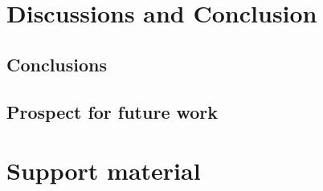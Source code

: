 \documentclass[
oneside,
11pt, a4paper,
footinclude=true,
headinclude=true,
cleardoublepage=empty
]{scrbook}
\begin{document}
\chapter{Discussions and Conclusion}
\section{Conclusions}
\section{Prospect for future work}







\chapter{Support material}
\end{document}
